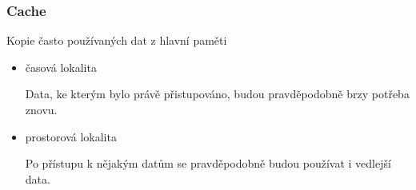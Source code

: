 \subsubsection*{Cache}

Kopie často používaných dat z hlavní paměti

\begin{itemize}
	\item časová lokalita 
	
	Data, ke kterým bylo právě přistupováno, budou pravděpodobně brzy potřeba znovu.
	
	\item prostorová lokalita
	
	Po přístupu k nějakým datům se pravděpodobně budou používat i vedlejší data.
\end{itemize}